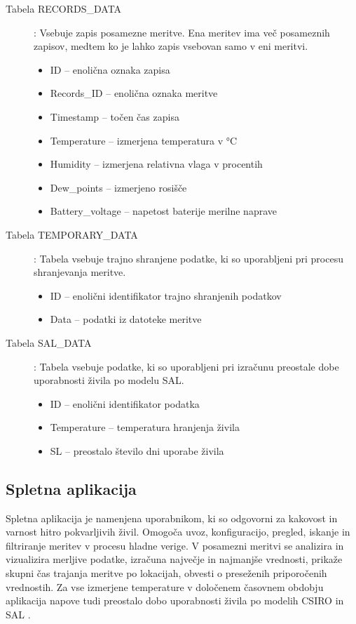 \documentclass[a4paper, 12pt]{book}
\begin{document}
\begin{description}
\item[Tabela RECORDS\_DATA] : Vsebuje zapis posamezne meritve. Ena meritev ima več posameznih zapisov, medtem ko je lahko zapis vsebovan samo v eni meritvi.
	\begin{itemize}
		\item ID – enolična oznaka zapisa
		\item Records\_ID – enolična oznaka meritve
		\item Timestamp – točen čas zapisa
		\item Temperature – izmerjena temperatura v °C
		\item Humidity – izmerjena relativna vlaga v procentih
		\item Dew\_points – izmerjeno rosišče
		\item Battery\_voltage – napetost baterije merilne naprave
	\end{itemize}
	
\item[Tabela TEMPORARY\_DATA] : Tabela vsebuje trajno shranjene podatke, ki so uporabljeni pri procesu shranjevanja meritve.
	\begin{itemize}
		\item ID – enolični identifikator trajno shranjenih podatkov
		\item Data – podatki iz datoteke meritve
	\end{itemize}

\item[Tabela SAL\_DATA] : Tabela vsebuje podatke, ki so uporabljeni pri izračunu preostale dobe uporabnosti živila po modelu SAL.
	\begin{itemize}
		\item ID – enolični identifikator podatka
		\item Temperature – temperatura hranjenja živila
		\item SL – preostalo število dni uporabe živila
	\end{itemize}
\end{description}



\subsection{Spletna aplikacija}

Spletna aplikacija je namenjena uporabnikom, ki so odgovorni za kakovost in varnost hitro pokvarljivih živil. Omogoča uvoz, konfiguracijo, pregled, iskanje in filtriranje meritev v procesu hladne verige. V posamezni meritvi se analizira in vizualizira merljive podatke, izračuna največje in najmanjše vrednosti, prikaže skupni čas trajanja meritve po lokacijah, obvesti o preseženih priporočenih vrednostih. Za vse izmerjene temperature v določenem časovnem obdobju aplikacija napove tudi preostalo dobo uporabnosti živila po modelih CSIRO in SAL \cite{magistrska-marolt}.
\end{document}
